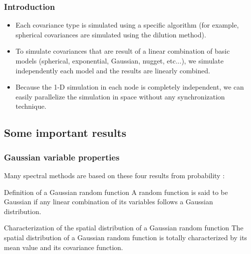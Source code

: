 \documentclass{beamer}
\begin{document}

\begin{frame}
\frametitle{Introduction}
\begin{itemize}
\item Each covariance type is simulated using a specific algorithm 
(for example, spherical covariances are simulated using the dilution method). \cite{e2006}
\item To simulate covariances that are result of a linear combination of basic models 
(spherical, exponential, Gaussian, nugget, etc...), we simulate independently each 
model and the results are linearly combined.
\item Because the 1-D simulation in each node is completely independent, 
we can easily parallelize the simulation in space without any synchronization technique. 
\end{itemize}
\end{frame}

\subsection {Some important results}


\begin{frame}
\frametitle{Gaussian variable properties}

Many spectral methods are based on these four  results from probability \cite{l2002}:

\begin{block}{Definition of a Gaussian random function}
A random function is said to be Gaussian if any linear combination of its variables follows a Gaussian distribution.
\end{block}

\begin{block}{Characterization of the spatial distribution of a Gaussian random function}
The spatial distribution of a Gaussian random function is totally characterized by its mean value and its covariance function.
\end{block}
\end{frame}
\end{document}
